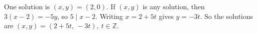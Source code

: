 One solution is $(x,y)=(2,0)$. If $(x,y)$ is any solution, then $3(x-2)=-5y$, so $5\mid x-2$. Writing $x=2+5t$ gives $y=-3t$. So the solutions are $\boxed{(x,y)=(2+5t,\,-3t),\ t\in\mathbb Z}$.
